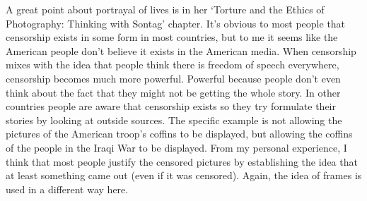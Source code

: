 \documentclass[11pt, oneside]{article}
\begin{document}
\par A great point about portrayal of lives is in her `Torture and the Ethics of Photography: Thinking with Sontag' chapter. It's obvious to most people that censorship exists in some form in most countries, but to me it seems like the American people don't believe it exists in the American media. When censorship mixes with the idea that people think there is freedom of speech everywhere, censorship becomes much more powerful. Powerful because people don't even think about the fact that they might not be getting the whole story. In other countries people are aware that censorship exists so they try formulate their stories by looking at outside sources. The specific example is not allowing the pictures of the American troop's coffins to be displayed, but allowing the coffins of the people in the Iraqi War to be displayed. From my personal experience, I think that most people justify the censored pictures by establishing the idea that at least something came out (even if it was censored). Again, the idea of frames is used in a different way here. 

\par 
\end{document}
